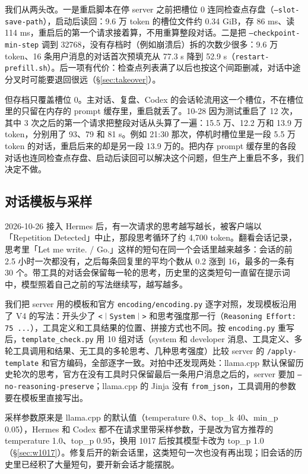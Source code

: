 \documentclass[11pt,a4paper]{article}
\newcommand{\code}[1]{\texttt{#1}}
\newcommand{\ctok}[1]{\mbox{\xeCJKsetup{CJKecglue={}}\code{#1}}}
\begin{document}
我们从两头改。一是重启脚本在停 server 之前把槽位 0 连同检查点存盘（\code{--slot-save-path}），启动后读回：9.6 万 token 的槽位文件约 0.34 GiB，存 86 ms、读 114 ms，重启后的第一个请求接着算，不用重算整段对话。二是把 \code{--checkpoint-min-step} 调到 32768，没有存档时（例如崩溃后）拆的次数少很多：9.6 万 token、16 条用户消息的对话首次预填充从 77.3 s 降到 52.9 s（\code{restart-prefill.sh}）。后一项有代价：检查点列表满了以后也按这个间距删减，对话中途分叉时可能要退回很远（\S\ref{sec:takeover}）。

但存档只覆盖槽位 0。主对话、复盘、Codex 的会话轮流用这一个槽位，不在槽位里的只留在内存的 prompt 缓存里，重启就丢了。10-28 因为测试重启了 12 次，其中 3 次之后的第一个请求把整段对话从头算了一遍：15.5 万、12.2 万和 13.9 万 token，分别用了 93、79 和 81 s。例如 21:30 那次，停机时槽位里是一段 5.5 万 token 的对话，重启后来的却是另一段 13.9 万的。把内存 prompt 缓存里的各段对话也连同检查点存盘、启动后读回可以解决这个问题，但生产上重启不多，我们决定不做。

\subsection{对话模板与采样}
\label{sec:template}

2026-10-26 接入 Hermes 后，有一次请求的思考越写越长，被客户端以「Repetition Detected」中止，那段思考循环了约 4,700 token。翻看会话记录，思考里「Let me write. / Go.」这样的短句在同一个会话里越来越多：会话的前 2.5 小时一次都没有，之后每条回复里的平均个数从 0.2 涨到 16，最多的一条有 30 个。带工具的对话会保留每一轮的思考，历史里的这类短句一直留在提示词中，模型照着自己之前的写法继续写，越写越多。

我们把 server 用的模板和官方 \code{encoding/encoding.py} 逐字对照，发现模板沿用了 V4 的写法：开头少了 \ctok{<｜System｜>} 和思考强度那一行（\code{Reasoning Effort: 75 ...}），工具定义和工具结果的位置、拼接方式也不同。按 \code{encoding.py} 重写后，\code{template\_check.py} 用 10 组对话（system 和 developer 消息、工具定义、多轮工具调用和结果、无工具的多轮思考、几种思考强度）比较 server 的 \code{/apply-template} 和官方编码，全部逐字一致。对拍中还发现两处：llama.cpp 默认保留历史轮次的思考，官方在没有工具时只保留最后一条用户消息之后的，server 要加 \code{--no-reasoning-preserve}；llama.cpp 的 Jinja 没有 \code{from\_json}，工具调用的参数要在模板里直接写出。

采样参数原来是 llama.cpp 的默认值（temperature 0.8、top\_k 40、min\_p 0.05），Hermes 和 Codex 都不在请求里带采样参数，于是改为官方推荐的 temperature 1.0、top\_p 0.95，换用 1017 后按其模型卡改为 top\_p 1.0（\S\ref{sec:w1017}）。修复后开的新会话里，这类短句一次也没有再出现；旧会话的历史里已经积了大量短句，要开新会话才能摆脱。
\end{document}

